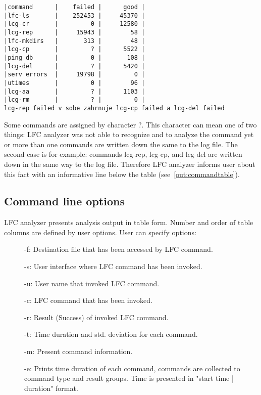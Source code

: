 \documentclass[a4paper, 11pt]{article} %
\begin{document}
\begin{lstlisting}[style=cli, label={out:commandtable}, caption={lfc\_analyzer -i logfile}]
|command      |    failed |      good |
|lfc-ls       |    252453 |     45370 |
|lcg-cr       |         0 |     12580 |
|lcg-rep      |     15943 |        58 |
|lfc-mkdirs   |       313 |        48 |
|lcg-cp       |         ? |      5522 |
|ping db      |         0 |       108 |
|lcg-del      |         ? |      5420 |
|serv errors  |     19798 |         0 |
|utimes       |         0 |        96 |
|lcg-aa       |         ? |      1103 |
|lcg-rm       |         ? |         0 |
lcg-rep failed v sobe zahrnuje lcg-cp failed a lcg-del failed
\end{lstlisting}

Some commands are assigned by character ?. This character can mean one of two things: LFC analyzer was not able to recognize and to analyze the command yet or more than one commands are written down the same to the log file. The second case is for example: commands lcg-rep, lcg-cp, and lcg-del are written down in the same way to the log file. Therefore LFC analyzer informs user about this fact with an informative line below the table (see~\ref{out:commandtable}).

\subsection{Command line options}

LFC analyzer presents analysis output in table form. Number and order of table columns are defined by user options. User can specify options:


\begin{description}
    \item[] -f: Destination file that has been accessed by LFC command.
    \item[] -s: User interface where LFC command has been invoked. 
    \item[] -u: User name that invoked LFC command.
    \item[] -c: LFC command that has been invoked.
    \item[] -r: Result (Success) of invoked LFC command.
    \item[] -t: Time duration and std. deviation for each command.
    \item[] -m: Present command information.
    \item[] -e: Prints time duration of each command, commands are collected to command type and result groups.
Time is presented in "start time | duration" format.
\end{description}
\end{document}
